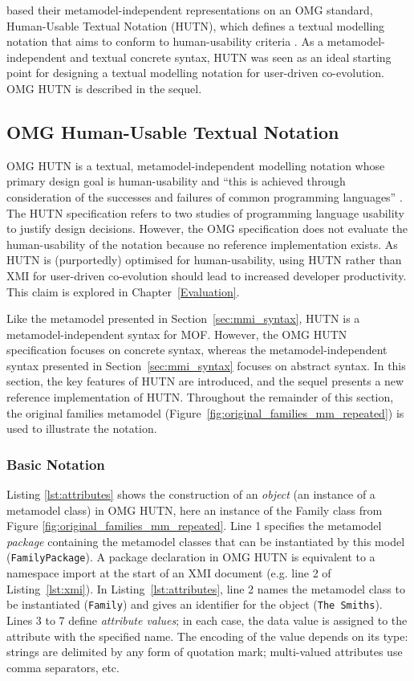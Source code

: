 \cite{steel01hutn,muller05hutn} based their me\-ta\-mo\-del-independent representations on an OMG standard, Human-Usable Textual Notation (HUTN), which defines a textual modelling notation that aims to conform to human-usability criteria \cite{hutn}. As a me\-ta\-mo\-del-inde\-pe\-nd\-ent and textual concrete syntax, HUTN was seen as an ideal starting point for designing a textual modelling notation for user-driven co-evolution. OMG HUTN is described in the sequel.

\subsection{OMG Human-Usable Textual Notation}
\label{subsec:hutn}
OMG HUTN is a textual, metamodel-independent modelling notation whose primary design goal is human-usability and ``this is achieved through consideration of the successes and failures of common programming languages'' \cite[Section 2.2]{hutn}. The HUTN specification refers to two studies of programming language usability to justify design decisions. However, the OMG specification does not evaluate the human-usability of the notation because no reference implementation exists. As HUTN is (purportedly) optimised for human-usability, using HUTN rather than XMI for user-driven co-evolution should lead to increased developer productivity. This claim is explored in Chapter~\ref{Evaluation}.

Like the metamodel presented in Section~\ref{sec:mmi_syntax}, HUTN is a metamodel-independent syntax for MOF. However, the OMG HUTN specification focuses on concrete syntax, whereas the metamodel-independent syntax presented in Section~\ref{sec:mmi_syntax} focuses on abstract syntax. In this section, the key features of HUTN are introduced, and the sequel presents a new reference implementation of HUTN. Throughout the remainder of this section, the original families metamodel (Figure~\ref{fig:original_families_mm_repeated}) is used to illustrate the notation.


\subsubsection{Basic Notation}
Listing \ref{lst:attributes} shows the construction of an \emph{object} (an instance of a metamodel class) in OMG HUTN, here an instance of the Family class from Figure \ref{fig:original_families_mm_repeated}. Line 1 specifies the metamodel \emph{package} containing the metamodel classes that can be instantiated by this model (\texttt{Fa\-mi\-lyPa\-ck\-a\-ge}). A package declaration in OMG HUTN is equivalent to a namespace import at the start of an XMI document (e.g. line 2 of Listing~\ref{lst:xmi}). In Listing~\ref{lst:attributes}, line 2 names the metamodel class to be instantiated (\texttt{Fa\-mi\-ly}) and gives an identifier for the object (\texttt{The Sm\-it\-hs}). Lines 3 to 7 define \emph{attribute values}; in each case, the data value is assigned to the attribute with the specified name. The encoding of the value depends on its type: strings are delimited by any form of quotation mark; multi-valued attributes use comma separators, etc.

